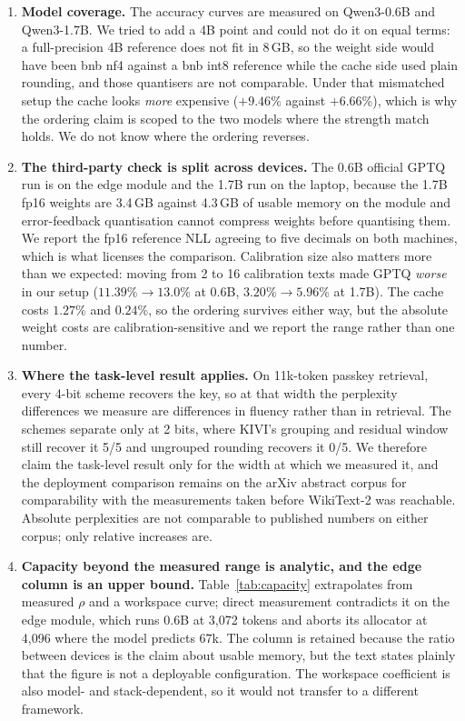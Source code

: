 \documentclass[5p]{elsarticle}
\begin{document}
\begin{enumerate}
\item \textbf{Model coverage.} The accuracy curves are measured on Qwen3-0.6B and
      Qwen3-1.7B. We tried to add a 4B point and could not do it on equal terms: a
      full-precision 4B reference does not fit in 8\,GB, so the weight side would
      have been bnb nf4 against a bnb int8 reference while the cache side used
      plain rounding, and those quantisers are not comparable. Under that
      mismatched setup the cache looks \emph{more} expensive ($+9.46\%$ against
      $+6.66\%$), which is why the ordering claim is scoped to the two models
      where the strength match holds. We do not know where the ordering reverses.

\item \textbf{The third-party check is split across devices.} The 0.6B official
      GPTQ run is on the edge module and the 1.7B run on the laptop, because the
      1.7B fp16 weights are 3.4\,GB against 4.3\,GB of usable memory on the module
      and error-feedback quantisation cannot compress weights before quantising
      them. We report the fp16 reference NLL agreeing to five decimals on both
      machines, which is what licenses the comparison. Calibration size also
      matters more than we expected: moving from 2 to 16 calibration texts made
      GPTQ \emph{worse} in our setup ($11.39\%\to13.0\%$ at 0.6B,
      $3.20\%\to5.96\%$ at 1.7B). The cache costs $1.27\%$ and $0.24\%$, so the
      ordering survives either way, but the absolute weight costs are
      calibration-sensitive and we report the range rather than one number.

\item \textbf{Where the task-level result applies.} On 11k-token passkey
      retrieval, every 4-bit scheme recovers the key, so at that width the
      perplexity differences we measure are differences in fluency rather than in
      retrieval. The schemes separate only at 2 bits, where KIVI's grouping and
      residual window still recover it 5/5 and ungrouped rounding recovers it 0/5.
      We therefore claim the task-level result only for the width at which we
      measured it, and the deployment comparison remains on the arXiv abstract
      corpus for comparability with the measurements taken before WikiText-2 was
      reachable. Absolute perplexities are not comparable to published numbers on
      either corpus; only relative increases are.

\item \textbf{Capacity beyond the measured range is analytic, and the edge column
      is an upper bound.} Table~\ref{tab:capacity} extrapolates from measured
      $\rho$ and a workspace curve; direct measurement contradicts it on the edge
      module, which runs 0.6B at 3{,}072 tokens and aborts its allocator at
      4{,}096 where the model predicts 67k. The
      column is retained because the ratio between devices is the claim about
      usable memory, but the text states plainly that the figure is not a deployable
      configuration. The workspace coefficient is also model- and
      stack-dependent, so it would not transfer to a different framework.


\end{enumerate}
\end{document}
